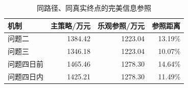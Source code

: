 \begin{table}[htbp]\centering\small
\caption{同路径、同真实终点的完美信息参照}
\begin{tabular}{lrrr}
\toprule
机制 & 主策略/万元 & 乐观参照/万元 & 参照距离 \\
\midrule
问题二 & 1384.42 & 1223.04 & 13.19\% \\
问题三 & 1346.18 & 1223.04 & 10.07\% \\
问题四日前 & 1465.46 & 1278.30 & 14.64\% \\
问题四日内 & 1425.21 & 1278.30 & 11.49\% \\
\bottomrule\end{tabular}\end{table}
